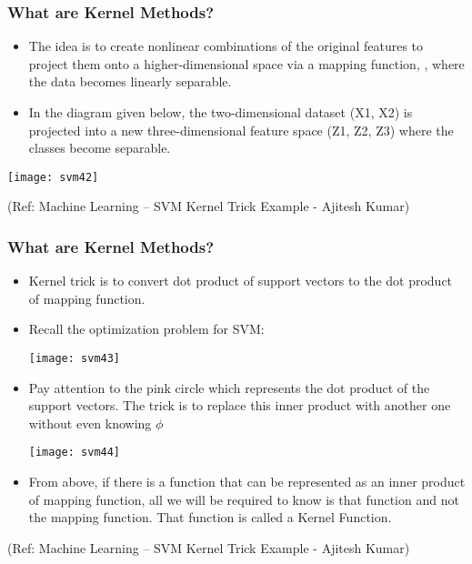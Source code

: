 \begin{frame}[fragile] \frametitle{What are Kernel Methods?}

\begin{itemize}
\item The idea is to create nonlinear combinations of the original features to project them onto a higher-dimensional space via a mapping function, , where the data becomes linearly separable. 
\item In the diagram given below, the two-dimensional dataset (X1, X2) is projected into a new three-dimensional feature space (Z1, Z2, Z3) where the classes become separable.
\end{itemize}


\begin{center}
\texttt{[image: svm42]}

\end{center}

{\tiny (Ref: Machine Learning – SVM Kernel Trick Example - Ajitesh Kumar)}
\end{frame}


\begin{frame}[fragile] \frametitle{What are Kernel Methods?}

\begin{itemize}
\item Kernel trick is to convert dot product of support vectors to the dot product of mapping function. 
\item Recall the optimization problem for SVM:

\begin{center}
\texttt{[image: svm43]}

\end{center}

\item Pay attention to the pink circle which represents the dot product of the support vectors. The trick is to replace this inner product with another one without even knowing $\phi$

\begin{center}
\texttt{[image: svm44]}

\end{center}

\item From above, if there is a function that can be represented as an inner product of mapping function, all we will be required to know is that function and not the mapping function. That function is called a Kernel Function.
\end{itemize}




{\tiny (Ref: Machine Learning – SVM Kernel Trick Example - Ajitesh Kumar)}
\end{frame}

